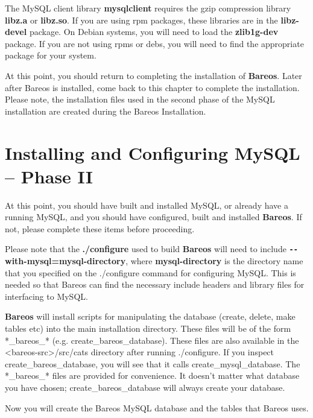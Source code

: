 The MySQL client library {\bf mysqlclient} requires the gzip compression
library {\bf libz.a} or {\bf libz.so}. If you are using rpm packages, these
libraries are in the {\bf libz-devel} package. On Debian systems, you will
need to load the {\bf zlib1g-dev} package. If you are not using rpms or debs,
you will need to find the appropriate package for your system.

At this point, you should return to completing the installation of {\bf
Bareos}. Later after Bareos is installed, come back to this chapter to
complete the installation. Please note, the installation files used in the
second phase of the MySQL installation are created during the Bareos
Installation.

\section{Installing and Configuring MySQL -- Phase II}

At this point, you should have built and installed MySQL, or already have a
running MySQL, and you should have configured, built and installed {\bf
Bareos}. If not, please complete these items before proceeding.

Please note that the {\bf ./configure} used to build {\bf Bareos} will need to
include {\bf \verb:--:with-mysql=mysql-directory}, where {\bf mysql-directory} is the
directory name that you specified on the ./configure command for configuring
MySQL. This is needed so that Bareos can find the necessary include headers
and library files for interfacing to MySQL.

{\bf Bareos} will install scripts for manipulating the database (create,
delete, make tables etc) into the main installation directory. These files
will be of the form *\_bareos\_* (e.g. create\_bareos\_database). These files
are also available in the {\textless}bareos-src{\textgreater}/src/cats directory after
running ./configure. If you inspect create\_bareos\_database, you will see
that it calls create\_mysql\_database. The *\_bareos\_* files are provided for
convenience. It doesn't matter what database you have chosen;
create\_bareos\_database will always create your database.

Now you will create the Bareos MySQL database and the tables that Bareos uses.



